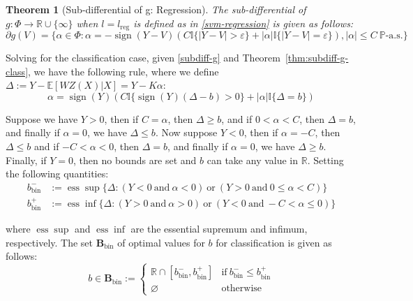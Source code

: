 \documentclass{article}
\newtheorem{theorem}{Theorem}
\begin{document}
\begin{theorem}[Sub-differential of g: Regression]\label{thm:subdiff-g-reg}
The sub-differential of $g :\Phi \rightarrow \mathbb{R} \cup \{ \infty\}$ when $l = l_{\text{reg}}$ is defined as in \ref{svm-regression} is given as follows:
\begin{equation}\label{regression-subdifferential}
\partial g(V) = \{\alpha \in \Phi : \alpha = -\operatorname{sign}(Y-V)(C\mathbb{I}\{|Y-V|>\varepsilon\} + |\alpha|\mathbb{I}\{|Y-V|=\varepsilon\}), |\alpha| \leq C\ \mathbb{P}\text{-a.s.}\} 
\end{equation} 
    
\end{theorem}

Solving for the classification case, given \ref{subdiff-g} and Theorem~\ref{thm:subdiff-g-class}, we have the following rule, where we define $\Delta := Y - \mathbb{E}[W Z(X)|X] = Y - K\alpha$:
\begin{equation}
    \alpha = \operatorname{sign}(Y)(C\mathbb{I}\{\operatorname{sign}(Y)(\Delta-b)>0\} + |\alpha|\mathbb{I}\{\Delta=b\})
\end{equation}

Suppose we have $Y > 0$, then if $C =\alpha$, then $\Delta \ge b$, and if $0 < \alpha < C$, then $\Delta = b$, and finally if $\alpha = 0$, we have $\Delta\le b$. Now suppose $Y < 0$, then if $\alpha = -C$, then $\Delta \le b$ and if $-C < \alpha < 0$, then $\Delta = b$, and finally if $\alpha = 0$, we have $\Delta\ge b$. Finally, if $Y = 0$, then no bounds are set and $b$ can take any value in $\mathbb{R}$. Setting the following quantities:
\begin{align}
    b^-_\text{bin} &:= \operatorname{ess} \sup\{\Delta : (Y <0\ \text{and} \ \alpha <0) \ \text{or} \ (Y>0\ \text{and} \ 0 \leq\alpha < C)\}\\
    b^+_\text{bin} &:= \operatorname{ess} \inf\{\Delta : (Y > 0\ \text{and} \ \alpha > 0) \ \text{or} \ (Y < 0 \ \text{and} \ -C < \alpha \leq 0) \}
\end{align}

where $\operatorname{ess} \sup$ and $\operatorname{ess} \inf$ are the essential supremum and infimum, respectively. The set $\mathbf{B}_\text{bin}$ of optimal values for $b$ for classification is given as follows:
\begin{equation}
   b \in\mathbf{B}_\text{bin} := \begin{cases}
       \mathbb{R} \cap [ b^-_\text{bin} , b^+_\text{bin}] &\text{if} \ b^-_\text{bin} \leq b^+_\text{bin} \\
       \varnothing &\text{otherwise}
   \end{cases} 
\end{equation}
\end{document}
